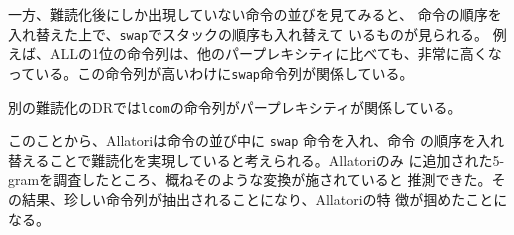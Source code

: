 \documentclass[conference]{IEEEtran}
\begin{document}
一方、難読化後にしか出現していない命令の並びを見てみると、
命令の順序を入れ替えた上で、\texttt{swap}でスタックの順序も入れ替えて
いるものが見られる。
%
例えば、ALLの1位の命令列は、他のパープレキシティに比べても、非常に高くなっている。この命令列が高いわけに\texttt{swap}命令列が関係している。

別の難読化のDRでは\texttt{lcom}の命令列がパープレキシティが関係している。

このことから、Allatoriは命令の並び中に \texttt{swap} 命令を入れ、命令
の順序を入れ替えることで難読化を実現していると考えられる。Allatoriのみ
に追加された5-gramを調査したところ、概ねそのような変換が施されていると
推測できた。その結果、珍しい命令列が抽出されることになり、Allatoriの特
徴が掴めたことになる。




%
%
%
%
\end{document}
